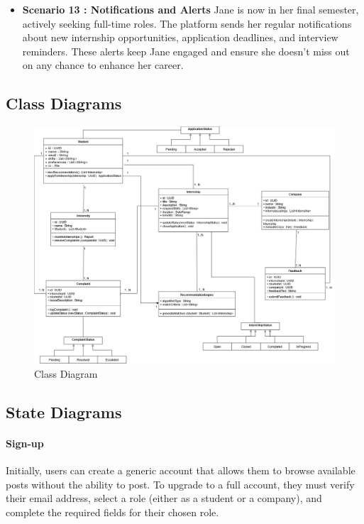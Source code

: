 \begin{itemize}
\item \textbf{Scenario 13 : Notifications and Alerts} 
Jane is now in her final semester, actively seeking full-time roles. The platform sends her regular notifications about new internship opportunities, application deadlines, and interview reminders. These alerts keep Jane engaged and ensure she doesn’t miss out on any chance to enhance her career. 


\end{itemize}
\subsection{Class Diagrams}
\label{subsec:class_diagrams}%
\begin{figure}[H]
    \centering
    \includegraphics[width=1\linewidth]{Images/Class diagrams/ClassDiagram.png}
    \caption{Class Diagram}
    \label{fig:enter-label}
    
    
\end{figure}

\subsection{State Diagrams}
\label{subsec:class_diagrams}%

\paragraph{Sign-up} Initially, users can create a generic account that allows them to browse available posts without the ability to post. To upgrade to a full account, they must verify their email address, select a role (either as a student or a company), and complete the required fields for their chosen role.

